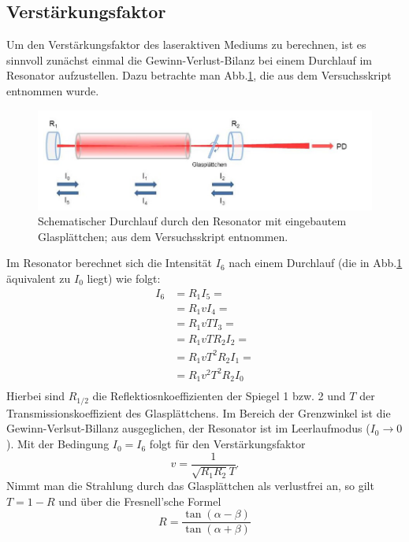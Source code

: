 \subsection{Verstärkungsfaktor}
Um den Verstärkungsfaktor des laseraktiven Mediums zu berechnen, ist es sinnvoll zunächst einmal die Gewinn-Verlust-Bilanz bei einem Durchlauf im Resonator aufzustellen. 
Dazu betrachte man Abb.\ref{pic:SchemaBrew}, die aus dem Versuchsskript entnommen wurde.
\begin{figure}[h]
    \centering
    \includegraphics[scale = 0.5]{Bilder/Auswertung/SchemaBrew.png}
    \caption{Schematischer Durchlauf durch den Resonator mit eingebautem Glasplättchen; aus dem Versuchsskript entnommen.}
    \label{pic:SchemaBrew}
\end{figure}
Im Resonator berechnet sich die Intensität $I_6$ nach einem Durchlauf (die in Abb.\ref{pic:SchemaBrew} äquivalent zu $I_0$ liegt) wie folgt:
\begin{align*}
    I_6 &= R_1 I_5 = \\
    &= R_1 v I_4 = \\
    &= R_1 v T I_3 = \\
    &= R_1 v T R_2 I_2 = \\
    &= R_1 v T^2 R_2 I_1 = \\
    &= R_1 v^2 T^2 R_2 I_0\\
\end{align*}
Hierbei sind $R_{1/2}$ die Reflektiosnkoeffizienten der Spiegel 1 bzw. 2 und $T$ der Transmissionskoeffizient des Glasplättchens. Im Bereich der Grenzwinkel ist die 
Gewinn-Verlsut-Billanz ausgeglichen, der Resonator ist im Leerlaufmodus ($I_0 \rightarrow 0$). Mit der Bedingung $I_0 = I_6$ folgt für den Verstärkungsfaktor 
\begin{equation*}
    v = \frac{1}{\sqrt{R_1R_2}T}.
\end{equation*}
Nimmt man die Strahlung durch das Glasplättchen als verlustfrei an, so gilt $T = 1-R$ und über die Fresnell'sche Formel
\begin{equation*}
    R = \frac{\tan(\alpha - \beta)}{\tan(\alpha + \beta)}
\end{equation*}
